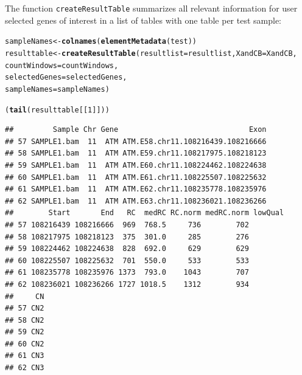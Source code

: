 \documentclass[article]{bioinf}\usepackage[]{graphicx}\usepackage[]{color}
\makeatletter
\newcommand{\hlnum}[1]{\textcolor[rgb]{0.686,0.059,0.569}{#1}}%
\newcommand{\hlstd}[1]{\textcolor[rgb]{0.345,0.345,0.345}{#1}}%
\newcommand{\hlkwb}[1]{\textcolor[rgb]{0.69,0.353,0.396}{#1}}%
\newcommand{\hlkwc}[1]{\textcolor[rgb]{0.333,0.667,0.333}{#1}}%
\newcommand{\hlkwd}[1]{\textcolor[rgb]{0.737,0.353,0.396}{\textbf{#1}}}%
\newenvironment{kframe}{%
 \def\at@end@of@kframe{}%
 \ifinner\ifhmode%
  \def\at@end@of@kframe{\end{minipage}}%
  \begin{minipage}{\columnwidth}%
 \fi\fi%
 \def\FrameCommand##1{\hskip\@totalleftmargin \hskip-\fboxsep
 \colorbox{shadecolor}{##1}\hskip-\fboxsep
     \hskip-\linewidth \hskip-\@totalleftmargin \hskip\columnwidth}%
 \MakeFramed {\advance\hsize-\width
   \@totalleftmargin\z@ \linewidth\hsize
   \@setminipage}}%
 {\par\unskip\endMakeFramed%
 \at@end@of@kframe}
\newenvironment{knitrout}{}{} %
\makeatother
\begin{document}
The function \verb+createResultTable+ summarizes all relevant information for 
user selected genes of interest in a list of tables with one table per test 
sample:


\begin{knitrout}
\color{fgcolor}\begin{kframe}
\begin{alltt}
\hlstd{sampleNames} \hlkwb{<-} \hlkwd{colnames}\hlstd{(}\hlkwd{elementMetadata}\hlstd{(test))}
\hlstd{resulttable} \hlkwb{<-} \hlkwd{createResultTable}\hlstd{(}\hlkwc{resultlist} \hlstd{= resultlist,} \hlkwc{XandCB} \hlstd{= XandCB,}
                                    \hlkwc{countWindows} \hlstd{= countWindows,}
                                    \hlkwc{selectedGenes} \hlstd{= selectedGenes,}
                                    \hlkwc{sampleNames} \hlstd{= sampleNames)}
\end{alltt}


{\ttfamily\noindent\itshape\color{messagecolor}{\#\# Calculating results for sample(s) SAMPLE1.bam}}

{\ttfamily\noindent\itshape\color{messagecolor}{\#\# Building table...}}

{\ttfamily\noindent\itshape\color{messagecolor}{\#\# Finished}}\begin{alltt}
\hlstd{(}\hlkwd{tail}\hlstd{(resulttable[[}\hlnum{1}\hlstd{]]))}
\end{alltt}
\begin{verbatim}
##         Sample Chr Gene                              Exon
## 57 SAMPLE1.bam  11  ATM ATM.E58.chr11.108216439.108216666
## 58 SAMPLE1.bam  11  ATM ATM.E59.chr11.108217975.108218123
## 59 SAMPLE1.bam  11  ATM ATM.E60.chr11.108224462.108224638
## 60 SAMPLE1.bam  11  ATM ATM.E61.chr11.108225507.108225632
## 61 SAMPLE1.bam  11  ATM ATM.E62.chr11.108235778.108235976
## 62 SAMPLE1.bam  11  ATM ATM.E63.chr11.108236021.108236266
##        Start       End   RC  medRC RC.norm medRC.norm lowQual
## 57 108216439 108216666  969  768.5     736        702        
## 58 108217975 108218123  375  301.0     285        276        
## 59 108224462 108224638  828  692.0     629        629        
## 60 108225507 108225632  701  550.0     533        533        
## 61 108235778 108235976 1373  793.0    1043        707        
## 62 108236021 108236266 1727 1018.5    1312        934        
##     CN
## 57 CN2
## 58 CN2
## 59 CN2
## 60 CN2
## 61 CN3
## 62 CN3
\end{verbatim}
\end{kframe}
\end{knitrout}
\end{document}
